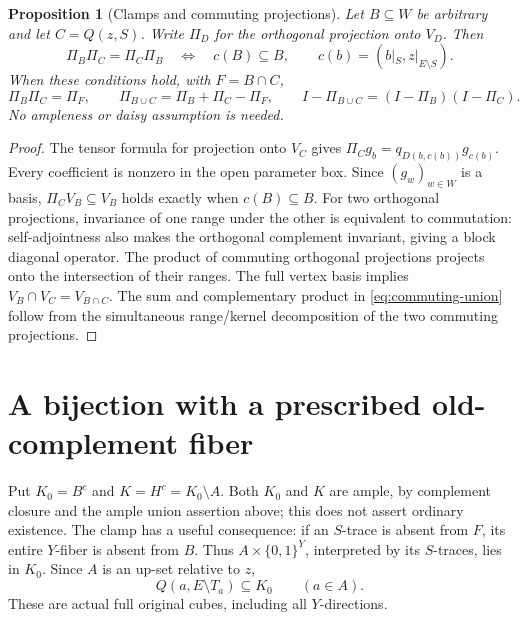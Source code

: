 \documentclass[11pt]{article}
\newtheorem{proposition}[theorem]{Proposition}
\theoremstyle{definition}
\begin{document}
\begin{proposition}[Clamps and commuting projections]\label{prop:commuting-clamp}
Let $B\subseteq W$ be arbitrary and let $C=Q(z,S)$. Write $\Pi_D$
for the orthogonal projection onto $V_D$. Then
\[
 \Pi_B\Pi_C=\Pi_C\Pi_B
 \quad\Longleftrightarrow\quad c(B)\subseteq B,
 \qquad c(b)=(b|_S,z|_{E\setminus S}).
\]
When these conditions hold, with $F=B\cap C$,
\begin{equation}\label{eq:commuting-union}
 \Pi_B\Pi_C=\Pi_F,\qquad
 \Pi_{B\cup C}=\Pi_B+\Pi_C-\Pi_F,\qquad
 I-\Pi_{B\cup C}=(I-\Pi_B)(I-\Pi_C).
\end{equation}
No ampleness or daisy assumption is needed.
\end{proposition}
\begin{proof}
The tensor formula for projection onto $V_C$ gives
$\Pi_Cg_b=q_{D(b,c(b))}g_{c(b)}$. Every coefficient is nonzero in
the open parameter box. Since $(g_w)_{w\in W}$ is a basis,
$\Pi_CV_B\subseteq V_B$ holds exactly when $c(B)\subseteq B$.
For two orthogonal projections, invariance of one range under the other
is equivalent to commutation: self-adjointness also makes the orthogonal
complement invariant, giving a block diagonal operator.
The product of commuting orthogonal projections projects onto the
intersection of their ranges. The full vertex basis implies
$V_B\cap V_C=V_{B\cap C}$. The sum and complementary product in
\eqref{eq:commuting-union} follow from the simultaneous range/kernel
decomposition of the two commuting projections.
\end{proof}

\section{A bijection with a prescribed old-complement fiber}
\label{sec:excision}
Put $K_0=B^c$ and $K=H^c=K_0\setminus A$.
Both $K_0$ and $K$ are ample, by complement closure and
the ample union assertion above; this does not assert ordinary existence.
The clamp has a useful
consequence: if an $S$-trace is absent from $F$, its entire $Y$-fiber
is absent from $B$. Thus $A\times\{0,1\}^Y$, interpreted by its
$S$-traces, lies in $K_0$. Since $A$ is an up-set relative to $z$,
\begin{equation}\label{eq:pinned-cubes}
 Q(a,E\setminus T_a)\subseteq K_0\qquad(a\in A).
\end{equation}
These are actual full original cubes, including all $Y$-directions.
\end{document}
